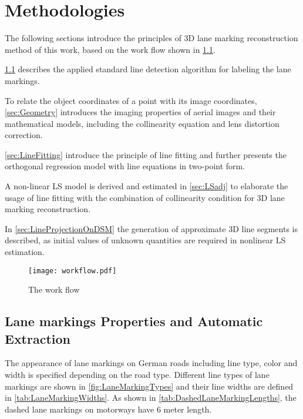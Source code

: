
\chapter{Methodologies}
\label{chap:k2}

The following sections introduce the principles of 3D lane marking reconstruction method of this work, based on the work flow shown in \cref{fig:FlowChart}.

\cref{sec:LineExtraction} describes the applied standard line detection algorithm for labeling the lane markings. 

To relate the object coordinates of a point with its image coordinates, \cref{sec:Geometry} introduces the imaging properties of aerial images and their mathematical models, including the collinearity equation and lens distortion correction.

\cref{sec:LineFitting} introduce the principle of line fitting and further presents the orthogonal regression model with line equations in two-point form. 

A non-linear LS model is derived and estimated in \cref{sec:LSadj} to elaborate the usage of line fitting with the combination of collinearity condition for 3D lane marking reconstruction.

In \cref{sec:LineProjectionOnDSM} the generation of approximate 3D line segments is described, as initial values of unknown quantities are required in nonlinear LS estimation.


\begin{figure}
	\centering
	\texttt{[image: workflow.pdf]}
	\caption{\small The work flow}
	\label{fig:FlowChart}
\end{figure}

\clearpage


\section{Lane markings Properties and Automatic Extraction}
\label{sec:LineExtraction}

The appearance of lane markings on German roads including line type, color and width is specified depending on the road type. Different line types of lane markings are shown in \cref{fig:LaneMarkingTypes} and their line widths are defined in \cref{tab:LaneMarkingWidths}. As shown in \cref{tab:DashedLaneMarkingLengths}, the dashed lane markings on motorways have 6 meter length.

